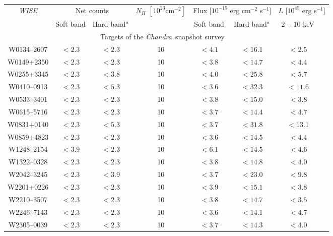 \documentclass[useAMS,usenatbib]{mnras}
\newcommand*{\xmm}{\textit{\mbox{XMM-Newton}}}
\newcommand*{\chandra}{\textit{Chandra}}
\newcommand*{\nhunits}{\mathrm{cm^{-2}}}
\begin{document}
\begin{table*}
	\caption{Constraints on the photometry and spectral properties of individual targets. Uncertainties for detected sources are reported at the $68\%$ confidence level, while for undetected objects we report the upper limits corresponding to the 90\% confidence level. Column density is derived by spectral analysis for W0116--0505 and W0220+0137, from hardness-ratio analysis for W0134--2922 (assuming the nominal value), and set to $N_H=10^{24}\nhunits$ for the remaining, undetected sources. Rest-frame $2-10$~keV, absorption-corrected luminosities are derived from the observed $2-7$ keV band (for \chandra) or $2-10$ keV band (for \xmm), which are less affected by obscuration, and associated uncertainties, than the $0.5-2$~keV band.}\label{phot_tab}
	\begin{tabular}{cccccccc}
		\hline
		\multicolumn{1}{c}{\textit{WISE}} &
		\multicolumn{2}{c}{Net counts}&
		\multicolumn{1}{c}{$N_H$ $[10^{23}\nhunits]$} &
		\multicolumn{2}{c}{Flux [$10^{-15}$ erg cm$^{-2}$ s$^{-1}$]}&
		\multicolumn{2}{c}{$L$ [$10^{45}$ erg s$^{-1}$]} \\
		\multicolumn{1}{c}{} &
		\multicolumn{1}{c}{Soft band} &		
\multicolumn{1}{c}{Hard band$^a$} &
		\multicolumn{1}{c}{} &
\multicolumn{1}{c}{Soft band} &		
\multicolumn{1}{c}{Hard band$^a$} &	
		\multicolumn{1}{c}{$2-10$ keV} &\\				
		\hline
				\multicolumn{7}{c}{Targets of the \chandra\, snapshot survey}\\
		W0134--2607 & $<2.3$ & $<2.3$  &10  &  $<4.1$ & $<16.1$ & $<2.5$ \\
		W0149+2350 & $<2.3$ & $<2.3$  & 10  &  $<3.8$ &  $<14.7$ & $<4.4$\\
		W0255+3345 & $<2.3$ &$<3.8$   &10  &   $<4.0$& $<25.8$& $<5.7$ \\ 
		W0410--0913  & $<2.3$ & $<5.3$ &10  &  $<3.6$ & $<32.3$&$<11.6$ \\ 
		W0533--3401  & $<2.3$ & $<2.3$ &10  & $<3.8$& $<15.0$&$<3.8$ \\ 
		W0615--5716  & $<2.3$ &$<2.3$   &10   &  $<3.7$ &$<14.4$	& $<4.7$ \\ 
		W0831+0140 & $<2.3$   & $<5.3$ &10  &   $<3.7$ & $<31.8$&$<13.1$  \\ 
		W0859+4823 & $<2.3$ & $<2.3$  &10  &  $<3.6$ &$<14.5$ & $<4.4$ \\ 
		W1248--2154 & $<3.9$  &$<2.3$  &10  &  $<6.1$&$<14.5$& $<4.6$\\ 
		W1322--0328 &  $<2.3$ &$<2.3$ &10  &   $<3.8$ & $<14.8$& $<4.0$ \\  
		W2042--3245 & $<2.3$& $<3.9$  &10   &  $<3.7$ &$<23.0$ & $<9.8$\\ 
		W2201+0226  & $<2.3$ & $<2.3$ &10  &   $<3.9$ & $<15.1$ & $<3.8$\\
		W2210--3507 &$<2.3$ & $<2.3$  & 10 &   $<3.8$&$<14.7$ & $<3.5$\\ 
		W2246--7143 & $<2.3$  & $<2.3$ &10  &  $<3.6$ & $<14.1$&$<4.7$\\ 
		W2305--0039 & $<2.3$ & $<2.3$ &10  &  $<3.7$& $<14.3$&$<4.0$\\ 


\end{tabular}
\end{table*}
\end{document}
